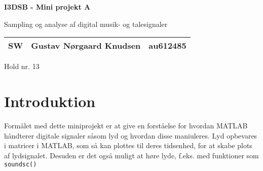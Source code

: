 \documentclass{article}
\begin{document}

\begin{titlepage}
    
  \begin{center}
    \vspace*{1cm}

    \Huge
    \textbf{I3DSB - Mini projekt A}

    \vspace{0.5cm}
    \huge
    Sampling og analyse af digital musik- og talesignaler \\
    \date\today

    \vspace{1.5cm}

    \large
    \begin{tabular}{c|lr}
      \hline
      SW & Gustav Nørgaard Knudsen & au612485 \\
      \hline
    \end{tabular}
    
    
    \vfill
    \vspace{2cm}

    Hold nr. 13

  \end{center}
\end{titlepage}

\newpage
\newpage

\setcounter{page}{1}


\section{Introduktion}
Formålet med dette miniprojekt er at give en forståelse for hvordan MATLAB håndterer digitale signaler såsom lyd og hvordan disse maniuleres. Lyd opbevares i matricer i MATLAB, som så kan plottes til deres tidsenhed, for at skabe plots af lydsignalet. Desuden er det også muligt at høre lyde, f.eks. med funktioner som \lstinline{soundsc()}






\end{document}
